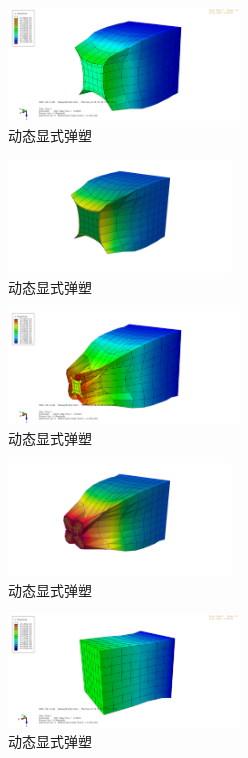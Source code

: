 \begin{figure}[!htbp]
  \centering
  \includegraphics[height=3cm]{fig/4/4.1.5/7.png}
  \caption{动态显式弹塑}
  \label{fig:4.1.4:4}
\end{figure}

\begin{figure}[!htbp]
  \centering
  \includegraphics[height=3cm]{fig/4/4.1.5/7-1.png}
  \caption{动态显式弹塑}
  \label{fig:4.1.4:4}
\end{figure}

\begin{figure}[!htbp]
  \centering
  \includegraphics[height=3cm]{fig/4/4.1.5/8.png}
  \caption{动态显式弹塑}
  \label{fig:4.1.4:4}
\end{figure}

\begin{figure}[!htbp]
  \centering
  \includegraphics[height=3cm]{fig/4/4.1.5/8-1.png}
  \caption{动态显式弹塑}
  \label{fig:4.1.4:4}
\end{figure}

\begin{figure}[!htbp]
  \centering
  \includegraphics[height=3cm]{fig/4/4.1.5/9.png}
  \caption{动态显式弹塑}
  \label{fig:4.1.4:4}
\end{figure}

